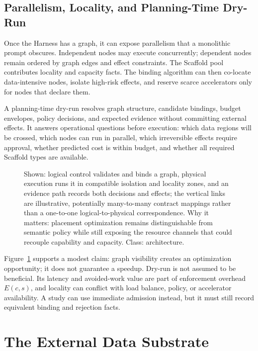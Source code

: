 \subsection{Parallelism, Locality, and Planning-Time Dry-Run}

Once the Harness has a graph, it can expose parallelism that a monolithic prompt obscures. Independent nodes may execute concurrently; dependent nodes remain ordered by graph edges and effect constraints. The Scaffold pool contributes locality and capacity facts. The binding algorithm can then co-locate data-intensive nodes, isolate high-risk effects, and reserve scarce accelerators only for nodes that declare them.

A planning-time dry-run resolves graph structure, candidate bindings, budget envelopes, policy decisions, and expected evidence without committing external effects. It answers operational questions before execution: which data regions will be crossed, which nodes can run in parallel, which irreversible effects require approval, whether predicted cost is within budget, and whether all required Scaffold types are available.

\begin{figure}[t]
\centering
\caption{Shown: logical control validates and binds a graph, physical execution runs it in compatible isolation and locality zones, and an evidence path records both decisions and effects; the vertical links are illustrative, potentially many-to-many contract mappings rather than a one-to-one logical-to-physical correspondence. Why it matters: placement optimization remains distinguishable from semantic policy while still exposing the resource channels that could recouple capability and capacity. Class: architecture.}
\label{fig:dry-run}
\end{figure}

Figure~\ref{fig:dry-run} supports a modest claim: graph visibility creates an optimization opportunity; it does not guarantee a speedup. Dry-run is not assumed to be beneficial. Its latency and avoided-work value are part of enforcement overhead $E(c,s)$, and locality can conflict with load balance, policy, or accelerator availability. A study can use immediate admission instead, but it must still record equivalent binding and rejection facts.

\section{The External Data Substrate}
\label{sec:data-substrate}

